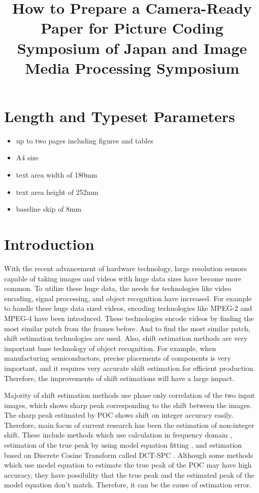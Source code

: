 \documentclass[a4paper,10pt,dvipdfmx,twocolumn,english]{jsarticle}
\title{How to Prepare a Camera-Ready Paper for Picture Coding Symposium of Japan and Image Media Processing Symposium}
\author{
   \EAuthor{Takanori Fujisawa$^\dag$}{.3\hsize}
   \EAuthor{Masaaki Ikehara$^\dag$}{.3\hsize}
}
\begin{document}
\pagestyle{empty}

\maketitle

\thispagestyle{empty}

\section{Length and Typeset Parameters}

\begin{itemize}
   \item up to two pages including figures and tables
   \item A4 size
   \item text area width of 180mm
   \item text area height of 252mm
   \item baseline skip of 8mm
\end{itemize}

\section{Introduction}
With the recent advancement of hardware technology,
   large resolution sensors capable of taking images and videos with huge data sizes have become more common. 
To utilize these huge data, the needs for technologies like video encoding, signal processing, and object recognition have increased. 
For example to handle these huge data sized videos, encoding technologies like MPEG-2 and MPEG-4 have been introduced. 
These technologies encode videos by finding the most similar patch from the frames before. 
And to find the most similar patch, shift estimation technologies are used. 
Also, shift estimation methods are very important base technology of object recognition.
For example, when manufacturing semiconductors, precise placements of components is very important, 
and it requires very accurate shift estimation for efficient production.
Therefore, the improvements of shift estimations will have a large impact.

Majority of shift estimation methods use phase only correlation of the two input images, 
   which shows sharp peak corresponding to the shift between the images. 
The sharp peak estimated by POC shows shift on integer accuracy easily. 
Therefore, main focus of current research has been the estimation of non-integer shift. 
These include methods which use calculation in frequency domain
   \cite{balci2006subpixel,hoge2003subspace,kilthau2002full,reddy1996fft}, 
   estimation of the true peak by using model equation fitting 
   \cite{pocsubimproved,takita2003high,pocsub,dobashi2013parallel}, 
   and estimation based on Discrete Cosine Transform called DCT-SPC 
   \cite{dctspc,ito2009multiple}. 
Although some methods which use model equation to estimate the true peak of the POC may have high accuracy, 
they have possibility that the true peak and the estimated peak of the model equation don't match. 
Therefore, it can be the cause of estimation error.
\end{document}
